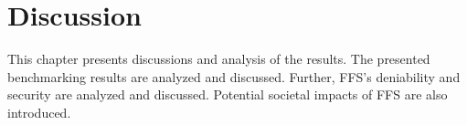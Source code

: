 
\chapter{Discussion}
\label{ch:discussion}
This chapter presents discussions and analysis of the results. The presented benchmarking results are analyzed and discussed. Further, FFS's deniability and security are analyzed and discussed. Potential societal impacts of FFS are also introduced.




